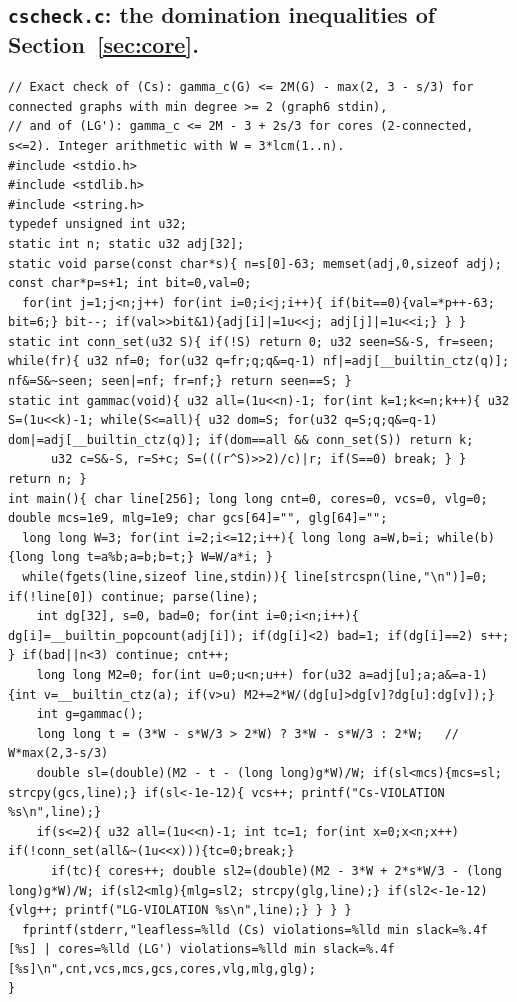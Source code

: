 \documentclass[11pt]{amsart}
\theoremstyle{definition}
\begin{document}
\subsection*{\texttt{cscheck.c}: the domination inequalities of Section~\ref{sec:core}.}
\begin{lstlisting}
// Exact check of (Cs): gamma_c(G) <= 2M(G) - max(2, 3 - s/3) for connected graphs with min degree >= 2 (graph6 stdin),
// and of (LG'): gamma_c <= 2M - 3 + 2s/3 for cores (2-connected, s<=2). Integer arithmetic with W = 3*lcm(1..n).
#include <stdio.h>
#include <stdlib.h>
#include <string.h>
typedef unsigned int u32;
static int n; static u32 adj[32];
static void parse(const char*s){ n=s[0]-63; memset(adj,0,sizeof adj); const char*p=s+1; int bit=0,val=0;
  for(int j=1;j<n;j++) for(int i=0;i<j;i++){ if(bit==0){val=*p++-63; bit=6;} bit--; if(val>>bit&1){adj[i]|=1u<<j; adj[j]|=1u<<i;} } }
static int conn_set(u32 S){ if(!S) return 0; u32 seen=S&-S, fr=seen; while(fr){ u32 nf=0; for(u32 q=fr;q;q&=q-1) nf|=adj[__builtin_ctz(q)]; nf&=S&~seen; seen|=nf; fr=nf;} return seen==S; }
static int gammac(void){ u32 all=(1u<<n)-1; for(int k=1;k<=n;k++){ u32 S=(1u<<k)-1; while(S<=all){ u32 dom=S; for(u32 q=S;q;q&=q-1) dom|=adj[__builtin_ctz(q)]; if(dom==all && conn_set(S)) return k;
      u32 c=S&-S, r=S+c; S=(((r^S)>>2)/c)|r; if(S==0) break; } } return n; }
int main(){ char line[256]; long long cnt=0, cores=0, vcs=0, vlg=0; double mcs=1e9, mlg=1e9; char gcs[64]="", glg[64]="";
  long long W=3; for(int i=2;i<=12;i++){ long long a=W,b=i; while(b){long long t=a%b;a=b;b=t;} W=W/a*i; }
  while(fgets(line,sizeof line,stdin)){ line[strcspn(line,"\n")]=0; if(!line[0]) continue; parse(line);
    int dg[32], s=0, bad=0; for(int i=0;i<n;i++){ dg[i]=__builtin_popcount(adj[i]); if(dg[i]<2) bad=1; if(dg[i]==2) s++; } if(bad||n<3) continue; cnt++;
    long long M2=0; for(int u=0;u<n;u++) for(u32 a=adj[u];a;a&=a-1){int v=__builtin_ctz(a); if(v>u) M2+=2*W/(dg[u]>dg[v]?dg[u]:dg[v]);}
    int g=gammac();
    long long t = (3*W - s*W/3 > 2*W) ? 3*W - s*W/3 : 2*W;   // W*max(2,3-s/3)
    double sl=(double)(M2 - t - (long long)g*W)/W; if(sl<mcs){mcs=sl; strcpy(gcs,line);} if(sl<-1e-12){ vcs++; printf("Cs-VIOLATION %s\n",line);} 
    if(s<=2){ u32 all=(1u<<n)-1; int tc=1; for(int x=0;x<n;x++) if(!conn_set(all&~(1u<<x))){tc=0;break;}
      if(tc){ cores++; double sl2=(double)(M2 - 3*W + 2*s*W/3 - (long long)g*W)/W; if(sl2<mlg){mlg=sl2; strcpy(glg,line);} if(sl2<-1e-12){vlg++; printf("LG-VIOLATION %s\n",line);} } } }
  fprintf(stderr,"leafless=%lld (Cs) violations=%lld min slack=%.4f [%s] | cores=%lld (LG') violations=%lld min slack=%.4f [%s]\n",cnt,vcs,mcs,gcs,cores,vlg,mlg,glg);
}
\end{lstlisting}
\end{document}
